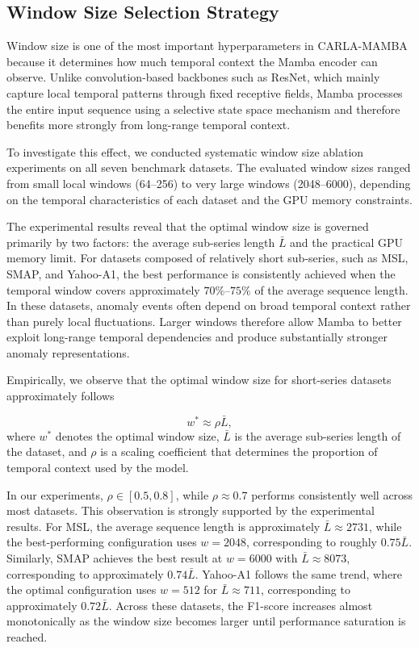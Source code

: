 \documentclass[runningheads]{llncs}
\begin{document}
\subsection{Window Size Selection Strategy}
\label{sec:window_selection}

Window size is one of the most important hyperparameters in CARLA-MAMBA because it determines how much temporal context the Mamba encoder can observe. Unlike convolution-based backbones such as ResNet, which mainly capture local temporal patterns through fixed receptive fields, Mamba processes the entire input sequence using a selective state space mechanism and therefore benefits more strongly from long-range temporal context.

To investigate this effect, we conducted systematic window size ablation experiments on all seven benchmark datasets. The evaluated window sizes ranged from small local windows (64--256) to very large windows (2048--6000), depending on the temporal characteristics of each dataset and the GPU memory constraints.

The experimental results reveal that the optimal window size is governed primarily by two factors: the average sub-series length $\bar{L}$ and the practical GPU memory limit. For datasets composed of relatively short sub-series, such as MSL, SMAP, and Yahoo-A1, the best performance is consistently achieved when the temporal window covers approximately $70\%$--$75\%$ of the average sequence length. In these datasets, anomaly events often depend on broad temporal context rather than purely local fluctuations. Larger windows therefore allow Mamba to better exploit long-range temporal dependencies and produce substantially stronger anomaly representations.

Empirically, we observe that the optimal window size for short-series datasets approximately follows

\[
w^* \approx \rho \bar{L},
\]
where $w^*$ denotes the optimal window size, 
$\bar{L}$ is the average sub-series length of the dataset, 
and $\rho$ is a scaling coefficient that determines the proportion of temporal context used by the model.

In our experiments, $\rho \in [0.5, 0.8]$, while $\rho \approx 0.7$ performs consistently well across most datasets. This observation is strongly supported by the experimental results. For MSL, the average sequence length is approximately $\bar{L}\approx2731$, while the best-performing configuration uses $w=2048$, corresponding to roughly $0.75\bar{L}$. Similarly, SMAP achieves the best result at $w=6000$ with $\bar{L}\approx8073$, corresponding to approximately $0.74\bar{L}$. Yahoo-A1 follows the same trend, where the optimal configuration uses $w=512$ for $\bar{L}\approx711$, corresponding to approximately $0.72\bar{L}$. Across these datasets, the F1-score increases almost monotonically as the window size becomes larger until performance saturation is reached.
\end{document}
